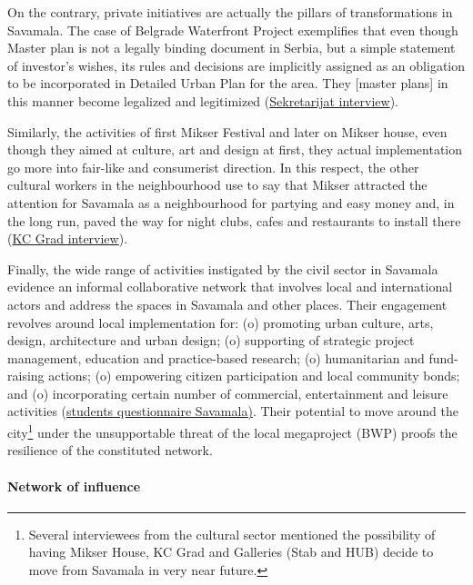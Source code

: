 \documentclass[11pt]{report}
\begin{document}
On the contrary, private initiatives are actually the pillars of transformations in Savamala. The case of Belgrade Waterfront Project exemplifies that even though Master plan is not a legally binding document in Serbia, but a simple statement of investor's wishes, its rules and decisions are implicitly assigned as an obligation to be incorporated in Detailed Urban Plan for the area.
They [master plans] in this manner become legalized and legitimized (\href{}{Sekretarijat interview}).

Similarly, the activities of first Mikser Festival and later on Mikser house, even though they aimed at culture, art and design at first, they actual implementation go more into fair-like and consumerist direction.
In this respect, the other cultural workers in the neighbourhood use to say that Mikser attracted the attention for Savamala as a neighbourhood for partying and easy money and, in the long run, paved the way for night clubs, cafes and restaurants to install there
(\href{}{KC Grad interview}).

Finally, the wide range of activities instigated by the civil sector in Savamala evidence an informal collaborative network that involves local and international actors and address the spaces in Savamala and other places.
Their engagement revolves around local implementation for:
(o) promoting urban culture, arts, design, architecture and urban design;
(o) supporting of strategic project management, education and practice-based research;
(o) humanitarian and fund-raising actions;
(o) empowering citizen participation and local community bonds;
and
(o) incorporating certain number of commercial, entertainment and leisure activities
(\href{}{students questionnaire Savamala)}.
Their potential to move around the city\footnote{Several interviewees from the cultural sector mentioned the possibility of having Mikser House, KC Grad and Galleries (Stab and HUB) decide to move from Savamala in very near future.}
under the unsupportable threat of the local megaproject (BWP) proofs the resilience of the constituted network.  

\paragraph{Network of influence}
\end{document}
